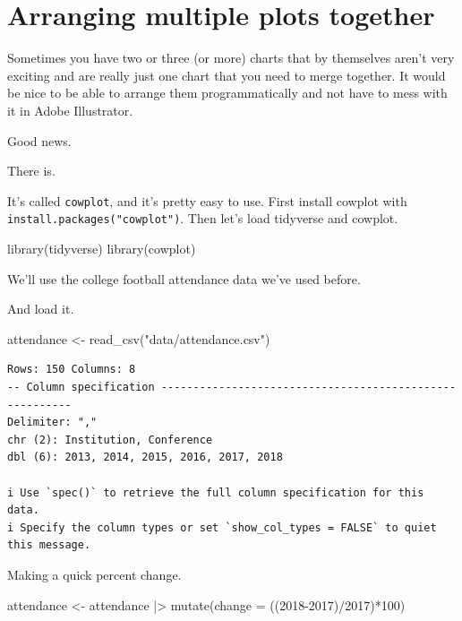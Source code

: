 \documentclass[
  letterpaper,
  DIV=11,
  numbers=noendperiod]{scrreprt}
\newenvironment{Shaded}{\begin{snugshade}}{\end{snugshade}}
\newcommand{\AttributeTok}[1]{\textcolor[rgb]{0.40,0.45,0.13}{#1}}
\newcommand{\DecValTok}[1]{\textcolor[rgb]{0.68,0.00,0.00}{#1}}
\newcommand{\FunctionTok}[1]{\textcolor[rgb]{0.28,0.35,0.67}{#1}}
\newcommand{\NormalTok}[1]{\textcolor[rgb]{0.00,0.23,0.31}{#1}}
\newcommand{\OtherTok}[1]{\textcolor[rgb]{0.00,0.23,0.31}{#1}}
\newcommand{\SpecialCharTok}[1]{\textcolor[rgb]{0.37,0.37,0.37}{#1}}
\newcommand{\StringTok}[1]{\textcolor[rgb]{0.13,0.47,0.30}{#1}}
\begin{document}
\hypertarget{arranging-multiple-plots-together}{%
\chapter{Arranging multiple plots
together}\label{arranging-multiple-plots-together}}

Sometimes you have two or three (or more) charts that by themselves
aren't very exciting and are really just one chart that you need to
merge together. It would be nice to be able to arrange them
programmatically and not have to mess with it in Adobe Illustrator.

Good news.

There is.

It's called \texttt{cowplot}, and it's pretty easy to use. First install
cowplot with \texttt{install.packages("cowplot")}. Then let's load
tidyverse and cowplot.

\begin{Shaded}
\begin{Highlighting}[]
\FunctionTok{library}\NormalTok{(tidyverse)}
\FunctionTok{library}\NormalTok{(cowplot)}
\end{Highlighting}
\end{Shaded}

We'll use the college football attendance data we've used before.

And load it.

\begin{Shaded}
\begin{Highlighting}[]
\NormalTok{attendance }\OtherTok{\textless{}{-}} \FunctionTok{read\_csv}\NormalTok{(}\StringTok{"data/attendance.csv"}\NormalTok{)}
\end{Highlighting}
\end{Shaded}

\begin{verbatim}
Rows: 150 Columns: 8
-- Column specification --------------------------------------------------------
Delimiter: ","
chr (2): Institution, Conference
dbl (6): 2013, 2014, 2015, 2016, 2017, 2018

i Use `spec()` to retrieve the full column specification for this data.
i Specify the column types or set `show_col_types = FALSE` to quiet this message.
\end{verbatim}

Making a quick percent change.

\begin{Shaded}
\begin{Highlighting}[]
\NormalTok{attendance }\OtherTok{\textless{}{-}}\NormalTok{ attendance }\SpecialCharTok{|\textgreater{}} \FunctionTok{mutate}\NormalTok{(}\AttributeTok{change =}\NormalTok{ ((}\StringTok{\textasciigrave{}}\AttributeTok{2018}\StringTok{\textasciigrave{}}\SpecialCharTok{{-}}\StringTok{\textasciigrave{}}\AttributeTok{2017}\StringTok{\textasciigrave{}}\NormalTok{)}\SpecialCharTok{/}\StringTok{\textasciigrave{}}\AttributeTok{2017}\StringTok{\textasciigrave{}}\NormalTok{)}\SpecialCharTok{*}\DecValTok{100}\NormalTok{)}
\end{Highlighting}
\end{Shaded}
\end{document}
